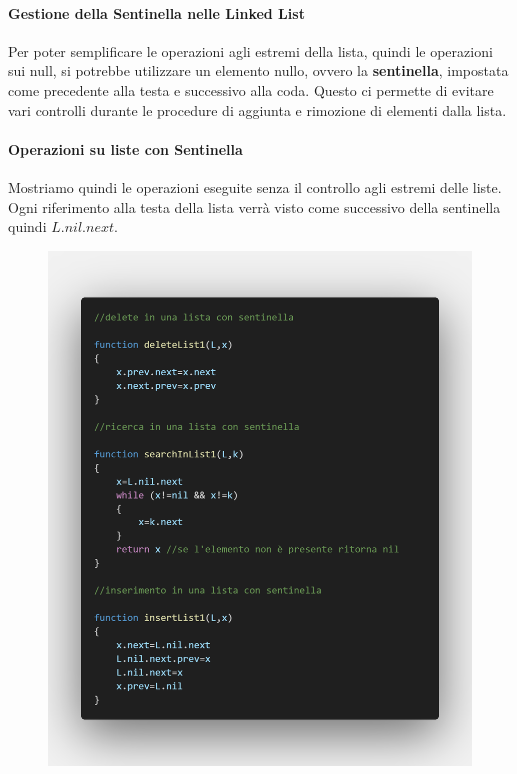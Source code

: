 \documentclass{article}
\begin{document}
\newpage

\paragraph{Gestione della Sentinella nelle Linked List} Per poter semplificare le operazioni agli estremi della lista, quindi le operazioni sui null, si potrebbe utilizzare un elemento nullo, ovvero la \textbf{sentinella}, impostata come precedente alla testa e successivo alla coda. Questo ci permette di evitare vari controlli durante le procedure di aggiunta e rimozione di elementi dalla lista.

\paragraph{Operazioni su liste con Sentinella} Mostriamo quindi le operazioni eseguite senza il controllo agli estremi delle liste. Ogni riferimento alla testa della lista verrà visto come successivo della sentinella quindi $L.nil.next$.

\begin{figure}[htbp]
    \center
    \includegraphics[scale=0.3]{img/operazioniSentinella.png}
\end{figure}
\end{document}
